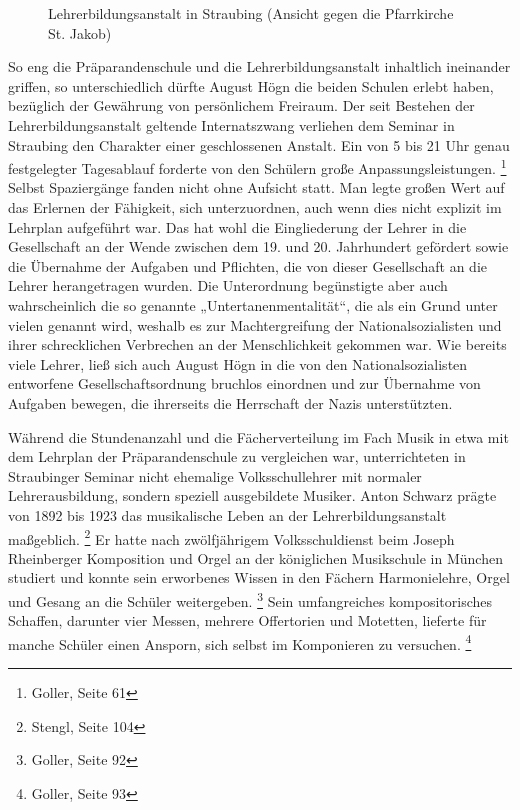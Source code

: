 \begin{figure}
\caption{Lehrerbildungsanstalt in Straubing (Ansicht gegen die
Pfarrkirche St. Jakob)}
\end{figure}

So eng die Präparandenschule und die Lehrerbildungsanstalt inhaltlich
ineinander griffen, so unterschiedlich dürfte August Högn die beiden
Schulen erlebt haben, bezüglich der Gewährung von persönlichem
Freiraum. Der seit Bestehen der Lehrerbildungsanstalt geltende
Internatszwang verliehen dem Seminar in Straubing den Charakter einer
geschlossenen Anstalt. Ein von 5 bis 21 Uhr genau festgelegter
Tagesablauf forderte von den Schülern große
Anpassungsleistungen. \footnote{Goller, Seite 61} Selbst Spaziergänge
fanden nicht ohne Aufsicht statt. Man legte großen Wert auf das
Erlernen der Fähigkeit, sich unterzuordnen, auch wenn dies nicht
explizit im Lehrplan aufgeführt war. Das hat wohl die Eingliederung der
Lehrer in die Gesellschaft an der Wende zwischen dem 19. und 20.
Jahrhundert gefördert sowie die Übernahme der Aufgaben und Pflichten,
die von dieser Gesellschaft an die Lehrer herangetragen wurden. Die
Unterordnung begünstigte aber auch wahrscheinlich die so genannte
„Untertanenmentalität“, die als ein Grund unter vielen genannt wird,
weshalb es zur Machtergreifung der Nationalsozialisten und ihrer
schrecklichen Verbrechen an der Menschlichkeit gekommen war. Wie
bereits viele Lehrer, ließ sich auch August Högn in die von den
Nationalsozialisten entworfene Gesellschaftsordnung bruchlos einordnen
und zur Übernahme von Aufgaben bewegen, die ihrerseits die Herrschaft
der Nazis unterstützten.

Während die Stundenanzahl und die Fächerverteilung im Fach Musik in etwa
mit dem Lehrplan der Präparandenschule zu vergleichen war,
unterrichteten in Straubinger Seminar nicht ehemalige Volksschullehrer
mit normaler Lehrerausbildung, sondern speziell ausgebildete Musiker.
Anton Schwarz prägte von 1892 bis 1923 das musikalische Leben an der
Lehrerbildungsanstalt maßgeblich. \footnote{Stengl, Seite 104} Er hatte
nach zwölfjährigem Volksschuldienst beim Joseph Rheinberger Komposition
und Orgel an der königlichen Musikschule in München studiert und konnte
sein erworbenes Wissen in den Fächern Harmonielehre, Orgel und Gesang
an die Schüler weitergeben. \footnote{Goller, Seite 92} Sein
umfangreiches kompositorisches Schaffen, darunter vier Messen, mehrere
Offertorien und Motetten, lieferte für manche Schüler einen Ansporn,
sich selbst im Komponieren zu versuchen. \footnote{Goller, Seite 93}


